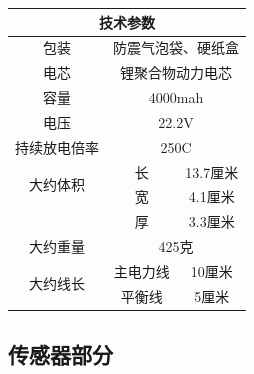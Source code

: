 \documentclass{ctexart}
\begin{document}
\begin{center}
\begin{longtable}{|c|c|c|}
\hline
\multicolumn{3}{|c|}{技术参数}\\
\hline
包装&\multicolumn{2}{c|}{防震气泡袋、硬纸盒}\\
\hline
电芯&\multicolumn{2}{c|}{锂聚合物动力电芯}\\
\hline
容量&\multicolumn{2}{c|}{4000mah}\\
\hline
电压&\multicolumn{2}{c|}{22.2V}\\
\hline
持续放电倍率&\multicolumn{2}{c|}{250C}\\
\hline
\multirow{2}{*}{大约体积}&长&13.7厘米\\
\cline{2-3}
&宽&4.1厘米\\
\hline
&厚&3.3厘米\\
\hline
大约重量&\multicolumn{2}{c|}{425克}\\
\hline
\multirow{2}{*}{大约线长}&主电力线&10厘米\\
\cline{2-3}
&平衡线&5厘米\\
\hline
\end{longtable}
\end{center}
\subsection{传感器部分}
\end{document}
